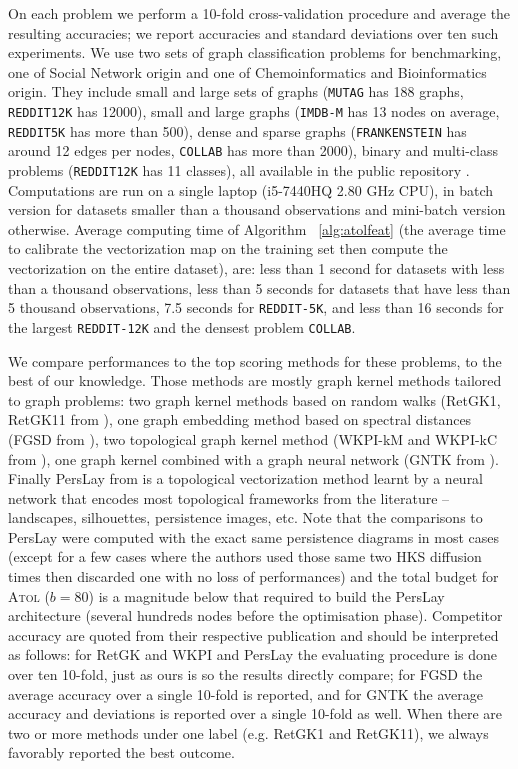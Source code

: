 \documentclass[twoside]{article}
\begin{document}
On each problem we perform a 10-fold cross-validation procedure and average the resulting accuracies; we report accuracies and standard deviations over ten such experiments. We use two sets of graph classification problems for benchmarking, one of Social Network origin and one of Chemoinformatics and Bioinformatics origin. They include small and large sets of graphs (\texttt{MUTAG} has 188 graphs, \texttt{REDDIT12K} has 12000), small and large graphs (\texttt{IMDB-M} has 13 nodes on average, \texttt{REDDIT5K} has more than 500), dense and sparse graphs (\texttt{FRANKENSTEIN} has around 12 edges per nodes, \texttt{COLLAB} has more than 2000), binary and multi-class problems (\texttt{REDDIT12K} has 11 classes), all available in the public repository \cite{benchmark}. Computations are run on a single laptop (i5-7440HQ 2.80 GHz CPU), in batch version for datasets smaller than a thousand observations and mini-batch version otherwise. Average computing time of Algorithm ~\ref{alg:atolfeat} (the average time to calibrate the vectorization map on the training set then compute the vectorization on the entire dataset), are: less than 1 second for datasets with less than a thousand observations, less than 5 seconds for datasets that have less than 5 thousand observations, 7.5 seconds for \texttt{REDDIT-5K}, and less than 16 seconds for the largest \texttt{REDDIT-12K} and the densest problem \texttt{COLLAB}.

We compare performances to the top scoring methods for these problems, to the best of our knowledge. Those methods are mostly graph kernel methods tailored to graph problems: two graph kernel methods based on random walks (RetGK1, RetGK11 from \cite{zhang2018retgk}), one graph embedding method based on spectral distances (FGSD from \cite{verma2017hunt}), two topological graph kernel method (WKPI-kM and WKPI-kC from \cite{qi2019}), one graph kernel combined with a graph neural network (GNTK from \cite{du19}). Finally PersLay from \cite{perslay} is a topological vectorization method learnt by a neural network that encodes most topological frameworks from the literature \--- landscapes, silhouettes, persistence images, etc. Note that the comparisons to PersLay were computed with the exact same persistence diagrams in most cases (except for a few cases where the authors used those same two HKS diffusion times then discarded one with no loss of performances) and the total budget for \textsc{Atol} ($b=80$) is a magnitude below that required to build the PersLay architecture (several hundreds nodes before the optimisation phase).
Competitor accuracy are quoted from their respective publication and should be interpreted as follows: for RetGK and WKPI and PersLay the evaluating procedure is done over ten 10-fold, just as ours is so the results directly compare; for FGSD the average accuracy over a single 10-fold is reported, and for GNTK the average accuracy and deviations is reported over a single 10-fold as well. When there are two or more methods under one label (e.g. RetGK1 and RetGK11), we always favorably reported the best outcome.
\end{document}
